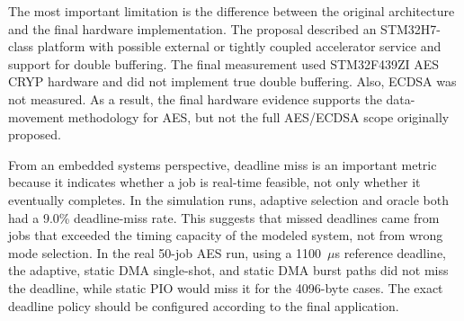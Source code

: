 \documentclass[conference]{IEEEtran}
\begin{document}
The most important limitation is the difference between the original architecture and the final hardware implementation. The proposal described an STM32H7-class platform with possible external or tightly coupled accelerator service and support for double buffering. The final measurement used STM32F439ZI AES CRYP hardware and did not implement true double buffering. Also, ECDSA was not measured. As a result, the final hardware evidence supports the data-movement methodology for AES, but not the full AES/ECDSA scope originally proposed.

From an embedded systems perspective, deadline miss is an important metric because it indicates whether a job is real-time feasible, not only whether it eventually completes. In the simulation runs, adaptive selection and oracle both had a 9.0\% deadline-miss rate. This suggests that missed deadlines came from jobs that exceeded the timing capacity of the modeled system, not from wrong mode selection. In the real 50-job AES run, using a 1100~$\mu$s reference deadline, the adaptive, static DMA single-shot, and static DMA burst paths did not miss the deadline, while static PIO would miss it for the 4096-byte cases. The exact deadline policy should be configured according to the final application.
\end{document}

